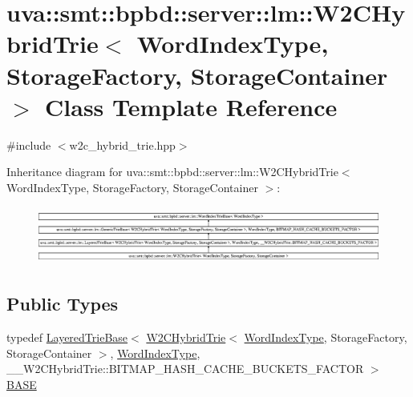\hypertarget{classuva_1_1smt_1_1bpbd_1_1server_1_1lm_1_1_w2_c_hybrid_trie}{}\section{uva\+:\+:smt\+:\+:bpbd\+:\+:server\+:\+:lm\+:\+:W2\+C\+Hybrid\+Trie$<$ Word\+Index\+Type, Storage\+Factory, Storage\+Container $>$ Class Template Reference}
\label{classuva_1_1smt_1_1bpbd_1_1server_1_1lm_1_1_w2_c_hybrid_trie}


{\ttfamily \#include $<$w2c\+\_\+hybrid\+\_\+trie.\+hpp$>$}

Inheritance diagram for uva\+:\+:smt\+:\+:bpbd\+:\+:server\+:\+:lm\+:\+:W2\+C\+Hybrid\+Trie$<$ Word\+Index\+Type, Storage\+Factory, Storage\+Container $>$\+:\begin{figure}[H]
\begin{center}
\leavevmode
\includegraphics[height=1.924399cm]{classuva_1_1smt_1_1bpbd_1_1server_1_1lm_1_1_w2_c_hybrid_trie}
\end{center}
\end{figure}
\subsection*{Public Types}
\begin{DoxyCompactItemize}
\item 
typedef \hyperlink{classuva_1_1smt_1_1bpbd_1_1server_1_1lm_1_1_layered_trie_base}{Layered\+Trie\+Base}$<$ \hyperlink{classuva_1_1smt_1_1bpbd_1_1server_1_1lm_1_1_w2_c_hybrid_trie}{W2\+C\+Hybrid\+Trie}$<$ \hyperlink{classuva_1_1smt_1_1bpbd_1_1server_1_1lm_1_1_word_index_trie_base_a77ee32bf3a9f8a89558bda4f2031200c}{Word\+Index\+Type}, Storage\+Factory, Storage\+Container $>$, \hyperlink{classuva_1_1smt_1_1bpbd_1_1server_1_1lm_1_1_word_index_trie_base_a77ee32bf3a9f8a89558bda4f2031200c}{Word\+Index\+Type}, \+\_\+\+\_\+\+W2\+C\+Hybrid\+Trie\+::\+B\+I\+T\+M\+A\+P\+\_\+\+H\+A\+S\+H\+\_\+\+C\+A\+C\+H\+E\+\_\+\+B\+U\+C\+K\+E\+T\+S\+\_\+\+F\+A\+C\+T\+O\+R $>$ \hyperlink{classuva_1_1smt_1_1bpbd_1_1server_1_1lm_1_1_w2_c_hybrid_trie_a32b183fa9be9ed16c3f99e1890893c8c}{B\+A\+S\+E}
\end{DoxyCompactItemize}
